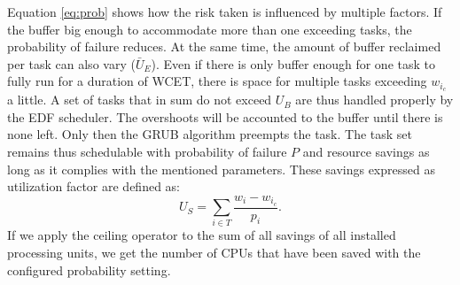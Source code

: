 \documentclass[]{scrartcl}
\begin{document}
Equation \ref{eq:prob} shows how the risk taken is influenced by multiple factors. 
If the buffer big enough to accommodate more than one exceeding tasks, the probability of failure reduces.
At the same time, the amount of buffer reclaimed per task can also vary ($\bar U_E$). 
Even if there is only buffer enough for one task to fully run for a duration of WCET, there is space for multiple tasks exceeding $w_{i_c}$ a little.
A set of tasks that in sum do not exceed $U_B$ are thus handled properly by the EDF scheduler. 
The overshoots will be accounted to the buffer until there is none left. Only then the GRUB algorithm preempts the task.
The task set remains thus schedulable with probability of failure $P$ and resource savings as long as it complies with the mentioned parameters. %
These savings expressed as utilization factor are defined as:
\begin{equation}
	U_S = \sum_{i \in T} \frac{w_i - w_{i_c}}{p_i}.
\end{equation}
If we apply the ceiling operator to the sum of all savings of all installed processing units, we get the number of CPUs that have been saved with the configured probability setting.





%
%
%
%
%
%


\end{document}
